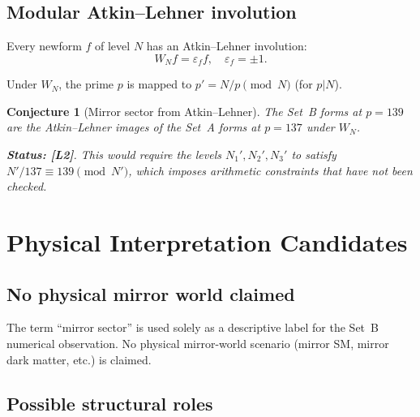 \documentclass[11pt,a4paper]{article}
\newtheorem{conjecture}{Conjecture}
\begin{document}
\subsection{Modular Atkin--Lehner involution}

Every newform $f$ of level $N$ has an Atkin--Lehner involution:
\begin{equation}
\label{eq:al}
  W_N f = \varepsilon_f f, \quad \varepsilon_f = \pm 1.
\end{equation}

Under $W_N$, the prime $p$ is mapped to $p' = N/p \pmod{N}$ (for $p | N$).

\begin{conjecture}[Mirror sector from Atkin--Lehner]\label{conj:al}
  The Set~B forms at $p = 139$ are the Atkin--Lehner images of the Set~A
  forms at $p = 137$ under $W_N$.

  \textbf{Status: [L2]}.  This would require the levels $N_1', N_2', N_3'$
  to satisfy $N'/137 \equiv 139 \pmod{N'}$, which imposes arithmetic
  constraints that have not been checked.
\end{conjecture}

\section{Physical Interpretation Candidates}
\label{sec:physical}

\subsection{No physical mirror world claimed}

The term ``mirror sector'' is used solely as a descriptive label for the
Set~B numerical observation.  No physical mirror-world scenario (mirror
SM, mirror dark matter, etc.) is claimed.

\subsection{Possible structural roles}
\end{document}
